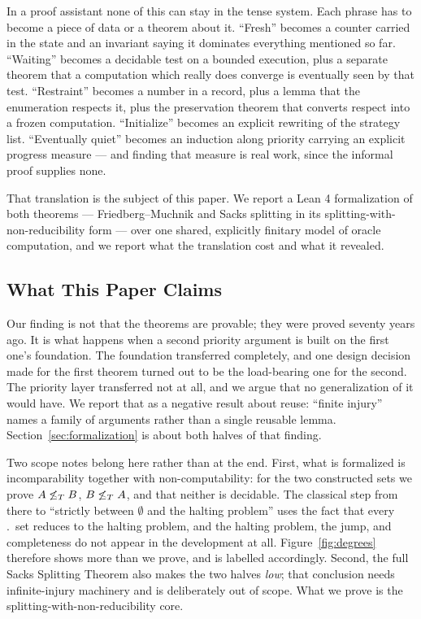 In a proof assistant none of this can stay in the tense system.  Each
phrase has to become a piece of data or a theorem about it.  ``Fresh''
becomes a counter carried in the state and an invariant saying it dominates
everything mentioned so far.  ``Waiting'' becomes a decidable test on a
bounded execution, plus a separate theorem that a computation which really
does converge is eventually seen by that test.  ``Restraint'' becomes a
number in a record, plus a lemma that the enumeration respects it, plus the
preservation theorem that converts respect into a frozen computation.
``Initialize'' becomes an explicit rewriting of the strategy list.
``Eventually quiet'' becomes an induction along priority carrying an
explicit progress measure --- and finding that measure is real work, since
the informal proof supplies none.

That translation is the subject of this paper.  We report a Lean 4
formalization of both theorems --- Friedberg--Muchnik and Sacks splitting
in its splitting-with-non-reducibility form --- over one shared,
explicitly finitary model of oracle computation, and we report what the
translation cost and what it revealed.

\subsection{What This Paper Claims}
\label{sec:scope}

Our finding is not that the theorems are provable; they were proved
seventy years ago.  It is what happens when a second priority argument is
built on the first one's foundation.  The foundation transferred
completely, and one design decision made for the first theorem turned out
to be the load-bearing one for the second.  The priority layer transferred
not at all, and we argue that no generalization of it would have.  We
report that as a negative result about reuse: ``finite injury'' names a
family of arguments rather than a single reusable lemma.
Section~\ref{sec:formalization} is about both halves of that finding.

Two scope notes belong here rather than at the end.  First, what is
formalized is incomparability together with non-computability: for the two
constructed sets we prove $A \not\leq_T B$, $B \not\leq_T A$, and that neither
is decidable.  The classical step from there to ``strictly between
$\emptyset$ and the halting problem'' uses the fact that every \ce.\ set
reduces to the halting problem, and the halting problem, the jump, and
completeness do not appear in the development at all.  Figure~\ref{fig:degrees}
therefore shows more than we prove, and is labelled accordingly.  Second,
the full Sacks Splitting Theorem also makes the two halves \emph{low}; that
conclusion needs infinite-injury machinery and is deliberately out of
scope.  What we prove is the splitting-with-non-reducibility core.
